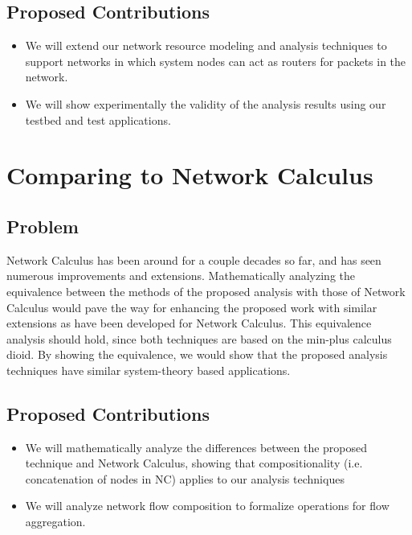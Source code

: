 \subsection{Proposed Contributions}
\begin{itemize}
	\item We will extend our network resource modeling and analysis techniques to support networks in which system nodes can act as routers for packets in the network.
	\item We will show experimentally the validity of the analysis results using our testbed and test applications.
\end{itemize}

\newpage

\section{Comparing \shorttool to Network Calculus}
\label{sec:equivalence}

\subsection{Problem}
Network Calculus has been around for a couple decades so far, and has seen numerous improvements and extensions.  Mathematically analyzing the equivalence between the methods of the proposed analysis with those of Network Calculus would pave the way for enhancing the proposed work with similar extensions as have been developed for Network Calculus.  This equivalence analysis should hold, since both techniques are based on the min-plus calculus dioid.  By showing the equivalence, we would show that the proposed analysis techniques have similar system-theory based applications.  

\subsection{Proposed Contributions}
\begin{itemize}
	\item We will mathematically analyze the differences between the proposed technique and Network Calculus, showing that compositionality (i.e. concatenation of nodes in NC) applies to our analysis techniques
	\item We will analyze network flow composition to formalize operations for flow aggregation.
\end{itemize}
